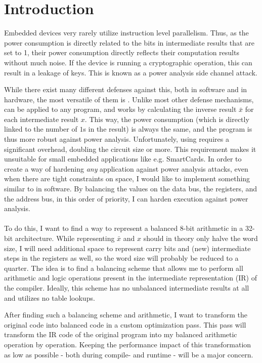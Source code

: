 \section{Introduction}
Embedded devices very rarely utilize instruction level parallelism.
Thus, as the power consumption is directly related to the bits in intermediate results that are set to 1, their power consumption directly reflects their computation results without much noise.
If the device is running a cryptographic operation, this can result in a leakage of keys.
This is known as a power analysis side channel attack\cite{kocher1999differential}.

While there exist many different defenses against this, both in software and in hardware, the most versatile of them is \dual{}\cite{sokolov2005design}.
Unlike most other defense mechanisms, \dual{} can be applied to any program, and works by calculating the inverse result $\bar{x}$ for each intermediate result $x$.
This way, the power consumption (which is directly linked to the number of $1$s in the result) is always the same, and the program is thus more robust against power analysis.
Unfortunately, using \dual{} requires a significant overhead, doubling the circuit size or more\cite{baddam2008path}.
This requirement makes it unsuitable for small embedded applications like e.g. SmartCards.
In order to create a way of hardening \emph{any} application against power analysis attacks, even when there are tight constraints on space, I would like to implement something similar to \dual{} in software.
By balancing the values on the data bus, the registers, and the address bus, in this order of priority, I can harden execution against power analysis.
\\
\\
To do this, I want to find a way to represent a balanced 8-bit arithmetic in a 32-bit architecture.
While representing $\bar{x}$ and $x$ should in theory only halve the word size, I will need additional space to represent carry bits and (new) intermediate steps in the registers as well, so the word size will probably be reduced to a quarter.
The idea is to find a balancing scheme that allows me to perform all arithmetic and logic operations present in the intermediate representation (IR) of the \llvm{} compiler.
Ideally, this scheme has no unbalanced intermediate results at all and utilizes no table lookups.

After finding such a balancing scheme and arithmetic, I want to transform the original code into balanced code in a custom \llvm{} optimization pass.
This pass will transform the IR code of the original program into my balanced arithmetic operation by operation.
Keeping the performance impact of this transformation as low as possible - both during compile- and runtime - will be a major concern.

